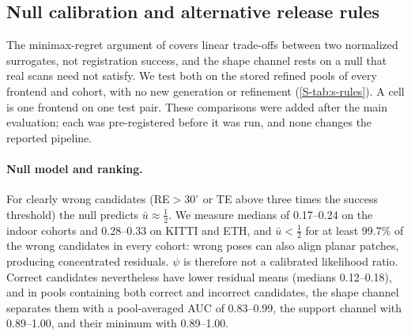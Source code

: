 \begin{table}[t]
\caption[Release rules on the same refined pools]{Release rules on the same refined pools, limited to the first 32 candidates. Training: 12\,000 cells (3000 pairs, four frontends); test: 72\,117 cells (nine cohorts, every frontend where it completed; MAC's 3497 failed pairs are excluded). A cell succeeds if its selected candidate is correct. $s$, $h$: the normalized channels of the release assay (, also in the first row); ties by $s$, $h$, queue order (lexicographic $s$-then-$h$ is equivalent to the $s$-only rule). Against : test cells released by the rule but not by it and vice versa, and test pairs on which the rule releases more or fewer of the frontends' cells; the cells of one pair share its scans and correspondences, so $p$ is from a sign test over pairs, Holm-corrected over the seven rules. Bottom: the expected count of a uniform choice inside the non-dominated set, and bounds that no rule on these pools can exceed (the non-dominated set bounds every rule above).}
\label{S-tab:s-rules}
\centering\footnotesize
\begingroup
\let\origcref\cref
\renewcommand{\cref}[1]{\origcref{#1}}

\endgroup

\end{table}

\subsection{Null calibration and alternative release rules}

The minimax-regret argument of  covers linear trade-offs between two normalized surrogates, not registration success, and the shape channel rests on a null that real scans need not satisfy. We test both on the stored refined pools of every frontend and cohort, with no new generation or refinement (\cref{S-tab:s-rules}). A cell is one frontend on one test pair. These comparisons were added after the main evaluation; each was pre-registered before it was run, and none changes the reported pipeline.

\paragraph{Null model and ranking.} For clearly wrong candidates (RE${}>30^\circ$ or TE above three times the success threshold) the null predicts $\bar u\approx\frac12$. We measure medians of 0.17--0.24 on the indoor cohorts and 0.28--0.33 on KITTI and ETH, and $\bar u<\frac12$ for at least 99.7\% of the wrong candidates in every cohort: wrong poses can also align planar patches, producing concentrated residuals. $\psi$ is therefore not a calibrated likelihood ratio. Correct candidates nevertheless have lower residual means (medians 0.12--0.18), and in pools containing both correct and incorrect candidates, the shape channel separates them with a pool-averaged AUC of 0.83--0.99, the support channel with 0.89--1.00, and their minimum with 0.89--1.00.

